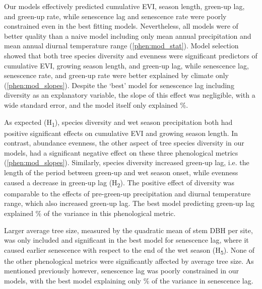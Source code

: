 \begin{refsection}
Our models effectively predicted cumulative EVI, season length, green-up lag, and green-up rate, while senescence lag and senescence rate were poorly constrained even in the best fitting models. Nevertheless, all models were of better quality than a naive model including only mean annual precipitation and mean annual diurnal temperature range (\autoref{phen:mod_stat}). Model selection showed that both tree species diversity and evenness were significant predictors of cumulative EVI, growing season length, and green-up lag, while senescence lag, senescence rate, and green-up rate were better explained by climate only (\autoref{phen:mod_slopes}). Despite the `best' model for senescence lag including diversity as an explanatory variable, the slope of this effect was negligible, with a wide standard error, and the model itself only explained \senesLagrsq{}\%.

As expected (H\textsubscript{1}), species diversity and wet season precipitation both had positive significant effects on cumulative EVI and growing season length. In contrast, abundance evenness, the other aspect of tree species diversity in our models, had a significant negative effect on these three phenological metrics (\autoref{phen:mod_slopes}). Similarly, species diversity increased green-up lag, i.e. the length of the period between green-up and wet season onset, while evenness caused a decrease in green-up lag (H\textsubscript{2}). The positive effect of diversity was comparable to the effects of pre-green-up precipitation and diurnal temperature range, which also increased green-up lag. The best model predicting green-up lag explained \greenLagrsq{}\% of the variance in this phenological metric.

Larger average tree size, measured by the quadratic mean of stem DBH per site, was only included and significant in the best model for senescence lag, where it caused earlier senescence with respect to the end of the wet season (H\textsubscript{5}). None of the other phenological metrics were significantly affected by average tree size. As mentioned previously however, senescence lag was poorly constrained in our models, with the best model explaining only \senesLagrsq{}\% of the variance in senescence lag.


\end{refsection}
